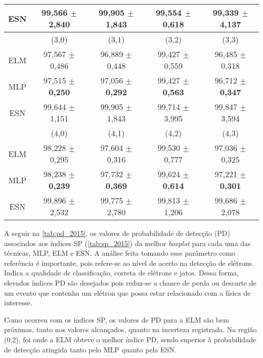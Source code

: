 \begin{table}[H]
\begin{footnotesize}
\begin{tabular}{c*{4}c}
			ESN & 99,566 $\pm$ 2,840 & 99,905 $\pm$ 1,843 & \cellcolor{blue!15}99,554 $\pm$  0,618 & 99,339 $\pm$ 4,137 \\ \midrule \midrule
	            &        (3,0)       &        (3,1)       &        (3,2)        &       (3,3)        \\ \cmidrule(lr){2-2}\cmidrule(lr){3-3}\cmidrule(lr){4-4}\cmidrule(lr){5-5}			
			ELM & 97,567 $\pm$ 0,486 & 96,889 $\pm$ 0,448 & \cellcolor{red!15}99,427 $\pm$  0,559 & \cellcolor{red!15}96,485 $\pm$ 0,318 \\
			MLP & 97,515 $\pm$ \textbf{0,250} & 97,056 $\pm$ \textbf{0,292} & 99,427 $\pm$  \textbf{0,563} & 96,712 $\pm$ \textbf{0,347} \\
			ESN & 99,644 $\pm$ 1,151 & 99,905 $\pm$ 1,843 & 99,714 $\pm$  3,995 & 99,847 $\pm$ 3,594 \\ \midrule \midrule
		        &        (4,0)       &        (4,1)       &        (4,2)        &  (4,3)        \\ \cmidrule(lr){2-2}\cmidrule(lr){3-3}\cmidrule(lr){4-4}\cmidrule(lr){5-5}			
			ELM & 98,228 $\pm$ 0,295 & \cellcolor{red!15}97,604 $\pm$ 0,316 & 99,530 $\pm$  0,777 & 97,036 $\pm$ 0,325 \\
			MLP & 98,238 $\pm$ \textbf{0,239} & 97,732 $\pm$ \textbf{0,369} & 99,624 $\pm$  \textbf{0,614} & 97,221 $\pm$ \textbf{0,301} \\
			ESN & 99,896 $\pm$ 2,532 & 99,775 $\pm$ 2,780 & \cellcolor{blue!15}99,813 $\pm$  1,206 & 99,686 $\pm$ 2,078 \\ \bottomrule
		\end{tabular}%
	\end{footnotesize}
\end{table}%

A seguir na \autoref{tab:pd_2015}, os valores de probabilidade de detecção (PD) associados aos índices SP (\autoref{tab:sp_2015}) da melhor \textit{boxplot} para cada uma das técnicas, MLP, ELM e ESN. A análise feita tomando esse parâmetro como referência é importante, pois refere-se ao nível de acerto na detecção de elétrons. Indica a qualidade de classificação, correta de elétrons e jatos. Dessa forma, elevados índices PD são desejados pois reduz-se a chance de perda ou descarte de um evento que contenha um elétron que possa estar relacionado com a física de interesse.

Como ocorreu com os índices SP, os valores de PD para a ELM são bem próximas, tanto nos valores alcançados, quanto na incerteza registrada. Na região (0,2), foi onde a ELM obteve o melhor índice PD, sendo superior à probabilidade de detecção atingida tanto pelo MLP quanto pela ESN.


